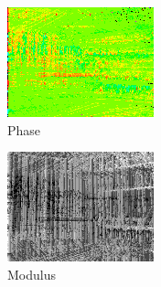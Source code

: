 \documentclass[10pt]{report}
\begin{document}
\begin{figure}[H]
        \begin{subfigure}[b]{0.3\textwidth}
                \centering
                \includegraphics[width=\textwidth]{D1-angle-h.png}
                \caption{Phase}
                \label{fig:p}
        \end{subfigure}
        \begin{subfigure}[b]{0.3\textwidth}
                \centering
                \includegraphics[width=\textwidth]{D1-norm-h.png}
                \caption{Modulus}
                \label{fig:m}
        \end{subfigure}
        \begin{subfigure}[b]{0.3\textwidth}
                \centering

\end{subfigure}
\end{figure}
\end{document}
